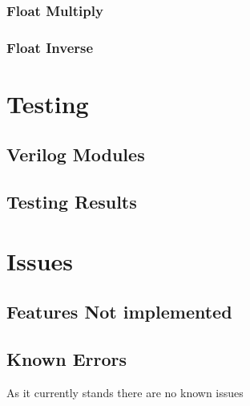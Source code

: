 \documentclass[conference]{IEEEtran}
\begin{document}
\subsubsection{Float Multiply}

\subsubsection{Float Inverse}


\section{Testing}

\subsection{Verilog Modules}

\subsection{Testing Results}

\section{Issues}
\subsection{Features Not implemented}


\subsection{Known Errors}
As it currently stands there are no known issues
\end{document}

